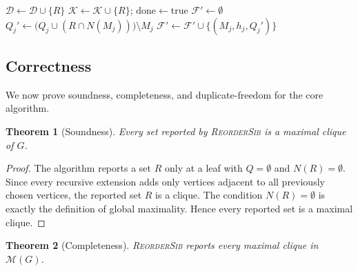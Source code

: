 \documentclass[sigconf, nonacm]{acmart}
\newtheorem{theorem}{Theorem}[section]
\theoremstyle{definition}
\theoremstyle{remark}
\begin{document}
\begin{algorithm}[t]
\caption{\textsc{Enumerate}: ordered DFS with post-discovery reordering}
\label{alg:enumerate}
\begin{algorithmic}[1]
    \State $\mathcal{D} \gets \mathcal{D} \cup \{R\}$
    \State $\mathcal{K} \gets \mathcal{K} \cup \{R\}$;\quad
           $\mathrm{done} \gets \mathrm{true}$
    \State $\mathcal{F}' \gets \emptyset$
      \State $Q_j' \gets \bigl(Q_j \cup (R \cap N(M_j))\bigr) \setminus M_j$
      \State $\mathcal{F}' \gets \mathcal{F}' \cup \{(M_j,h_j,Q_j')\}$
    \EndFor
    \State {}
  \EndIf
  \State \Return
\EndIf
{}
  \State {}
   \Return \EndIf
\EndFor
\EndProcedure
\end{algorithmic}
\end{algorithm}

\subsection{Correctness}

We now prove soundness, completeness, and duplicate-freedom for the core
algorithm.

\begin{theorem}[Soundness]\label{thm:sound}
Every set reported by \textsc{ReorderSib} is a maximal clique of $G$.
\end{theorem}

\begin{proof}
The algorithm reports a set $R$ only at a leaf with $Q=\emptyset$ and
$N(R)=\emptyset$.  Since every recursive extension adds only vertices adjacent
to all previously chosen vertices, the reported set $R$ is a clique.  The
condition $N(R)=\emptyset$ is exactly the definition of global maximality.
Hence every reported set is a maximal clique.
\end{proof}

\begin{theorem}[Completeness]\label{thm:complete}
\textsc{ReorderSib} reports every maximal clique in $\mathcal{M}(G)$.
\end{theorem}
\end{document}
